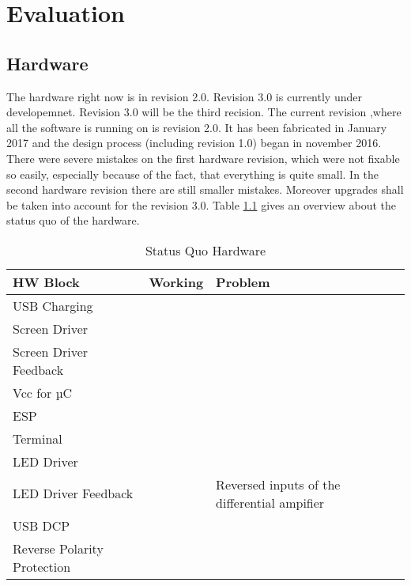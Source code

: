 \chapter{Evaluation}
\label{chap:evaluation}
\section{Hardware}
\label{sec:evaluation_hw}
The hardware right now is in revision 2.0. Revision 3.0 is currently under
developemnet. Revision 3.0 will be the third recision. The current revision
,where all the software is running on is revision 2.0. It has been fabricated in
January 2017 and the design process (including revision 1.0) began in november
2016. There were severe mistakes on the first hardware revision, which were not
fixable so easily, especially because of the fact, that everything is quite
small. In the second hardware revision there are still smaller mistakes.
Moreover upgrades shall be taken into account for the revision 3.0. 
\newpar
Table \ref{tab:hw_status_quo} gives an overview about the status quo of the hardware.
\begin{table}[H]
	\centering
	\begin{tabularx}{\textwidth}{llX}
		\textbf{HW Block}  	& \textbf{Working}& \textbf{Problem}  	\\\hline
		USB Charging 	& \checkmark	& 				\\
		Screen Driver  	& \checkmark    & 				\\
		Screen Driver Feedback& \checkmark    & 				\\
		Vcc for µC   	& \checkmark    & 				\\
		ESP   		& \checkmark    &                             	\\
		Terminal 	& \checkmark	&				\\
		LED Driver	& \checkmark	& 				\\
		LED Driver Feedback & & Reversed inputs of the differential ampifier \\
		USB DCP		& \checkmark	& 				\\
		Reverse Polarity Protection & \checkmark & \\
		\hline
	\end{tabularx}
	\caption{Status Quo Hardware}
	\label{tab:hw_status_quo}
\end{table}

